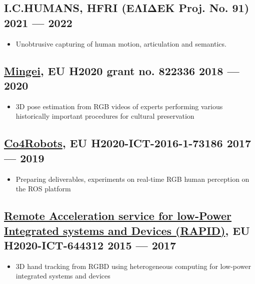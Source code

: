 \documentclass[a4,8pt]{article}
\newenvironment{zitemize}{
\begin{itemize}\itemsep0pt \parskip0pt \parsep1pt}
{\end{itemize}\vspace{-0.5cm}}
\begin{document}
\subsection*{I.C.HUMANS, {\normalsize\normalfont HFRI (ΕΛΙΔΕΚ Proj. No. 91)} \hfill 2021 --- 2022} 
    \begin{zitemize}
        \item Unobtrusive capturing of human motion, articulation and semantics.
    \end{zitemize}

\subsection*{\href{https://www.mingei-project.eu/}{Mingei}, {\normalsize\normalfont EU H2020 grant no. 822336} \hfill 2018 --- 2020} 
    \begin{zitemize}
        \item 3D pose estimation from RGB videos of experts performing various historically important procedures for cultural preservation
    \end{zitemize}

\subsection*{\href{http://www.co4robots.eu/}{Co4Robots}, {\normalsize\normalfont EU H2020-ICT-2016-1-73186 } \hfill 2017 --- 2019} 
    \begin{zitemize}
        \item Preparing deliverables, experiments on real-time RGB human perception on the ROS platform
    \end{zitemize}
    
\subsection*{\href{http://www.rapid-project.eu/}{Remote Acceleration service for low-Power Integrated systems and Devices (RAPID)}, {\normalsize\normalfont EU H2020-ICT-644312 } \hfill 2015 --- 2017} 
    \begin{zitemize}
        \item 3D hand tracking from RGBD using heterogeneous computing for low-power integrated systems and devices
    \end{zitemize}
    
\end{document}
